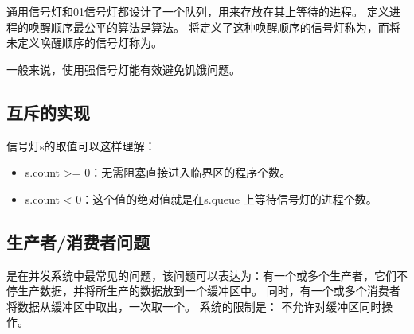 {    通用信号灯和01信号灯都设计了一个队列，用来存放在其上等待的进程。
    定义进程的唤醒顺序最公平的算法是算法。
    将定义了这种唤醒顺序的信号灯称为，而将未定义唤醒顺序的信号灯称为。

    一般来说，使用强信号灯能有效避免饥饿问题。

    \subsection{互斥的实现}
    {
        信号灯s的取值可以这样理解：

        \begin{itemize}
            \item s.count >= 0：无需阻塞直接进入临界区的程序个数。
            \item s.count < 0：这个值的绝对值就是在s.queue 上等待信号灯的进程个数。
        \end{itemize}
    }

    \subsection{生产者/消费者问题}
    {
        是在并发系统中最常见的问题，该问题可以表达为：有一个或多个生产者，它们不停生产数据，并将所生产的数据放到一个缓冲区中。
        同时，有一个或多个消费者将数据从缓冲区中取出，一次取一个。
        系统的限制是：
        不允许对缓冲区同时操作。
    }
}
